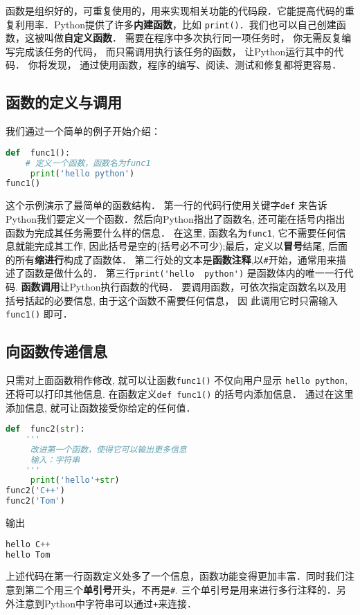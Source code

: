 函数是组织好的，可重复使用的，用来实现相关功能的代码段．它能提高代码的重复利用率．Python提供了许多\textbf{内建函数}，比如 \verb|print()|．我们也可以自己创建函数，这被叫做\textbf{自定义函数}． 需要在程序中多次执行同一项任务时， 你无需反复编写完成该任务的代码， 而只需调用执行该任务的函数， 让Python运行其中的代码． 你将发现， 通过使用函数，程序的编写、阅读、测试和修复都将更容易．

\subsection{函数的定义与调用}
我们通过一个简单的例子开始介绍：
\begin{lstlisting}[language=python]
def  func1():
    # 定义一个函数，函数名为func1
     print('hello python')
func1()
\end{lstlisting}
这个示例演示了最简单的函数结构． 第一行的代码行使用关键字\verb|def| 来告诉Python我们要定义一个函数．然后向Python指出了函数名, 还可能在括号内指出函数为完成其任务需要什么样的信息． 在这里, 函数名为\verb|func1|, 它不需要任何信息就能完成其工作, 因此括号是空的(括号必不可少);最后，定义以\textbf{冒号}结尾, 后面的所有\textbf{缩进行}构成了函数体． 第二行处的文本是\textbf{函数注释},以\verb|#|开始，通常用来描述了函数是做什么的．
第三行\verb|print('hello  python')| 是函数体内的唯一一行代码.
\textbf{函数调用}让Python执行函数的代码． 要调用函数，可依次指定函数名以及用括号括起的必要信息, 由于这个函数不需要任何信息， 因
此调用它时只需输入\verb|func1()| 即可．
\subsection{向函数传递信息}
只需对上面函数稍作修改, 就可以让函数\verb|func1()| 不仅向用户显示 \verb|hello python|, 还将可以打印其他信息. 在函数定义\verb|def func1()| 的括号内添加信息． 通过在这里添加信息, 就可让函数接受你给定的任何值．
\begin{lstlisting}[language=python]
def  func2(str):
    '''
     改进第一个函数，使得它可以输出更多信息
     输入：字符串
    '''
     print('hello'+str)
func2('C++')
func2('Tom')
\end{lstlisting}
输出
\begin{lstlisting}[language=python]
hello C++
hello Tom
\end{lstlisting}
上述代码在第一行函数定义处多了一个信息，函数功能变得更加丰富．同时我们注意到第二个用三个\textbf{单引号}开头，不再是\verb|#|. 三个单引号是用来进行多行注释的．另外注意到Python中字符串可以通过\verb|+|来连接．

